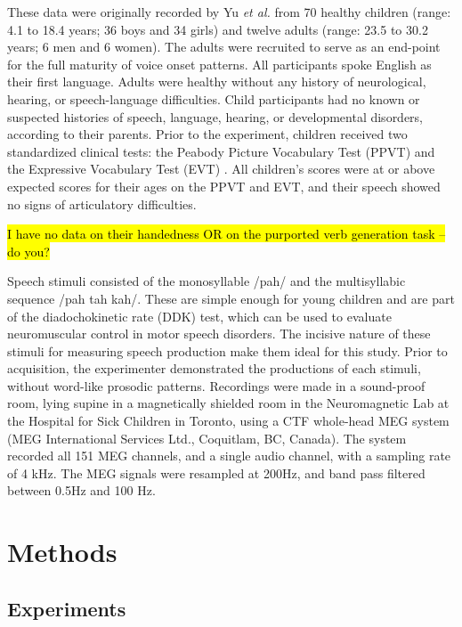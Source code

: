 \documentclass[a4paper]{article}
\newcommand{\FR}[1]{{\small \textcolor{red}{\hl{#1}}}}
\begin{document}
These data were originally recorded by Yu {\em et al.} \cite{Yu2015} from 70 healthy children (range: 4.1 to 18.4 years; 36 boys and 34 girls) and twelve adults (range: 23.5 to 30.2 years; 6 men and 6 women). The adults were recruited to serve as an end-point for the full maturity of voice onset patterns. All participants spoke English as their first language. Adults were healthy without any history of neurological, hearing, or speech-language difficulties. Child participants had no known or suspected histories of speech, language, hearing, or developmental disorders, according to their parents. Prior to the experiment, children received two standardized clinical tests: the Peabody Picture Vocabulary Test (PPVT) \cite{Dunn97} and the Expressive Vocabulary Test (EVT) \cite{EVT}. All children's scores were at or above expected scores for their ages on the PPVT and EVT, and their speech showed no signs of articulatory difficulties.

\FR{I have no data on their handedness OR on the purported verb generation task -- do you?}

Speech stimuli consisted of the monosyllable /pah/ and the multisyllabic sequence /pah tah kah/. These are simple enough for young children and are part of the diadochokinetic rate (DDK) test, which can be used to evaluate neuromuscular control in motor speech disorders. The incisive nature of these stimuli for measuring speech production make them ideal for this study. Prior to acquisition, the experimenter demonstrated the productions of each stimuli, without word-like prosodic patterns. Recordings were made in a sound-proof room, lying supine in a magnetically shielded room in the Neuromagnetic Lab at the Hospital for Sick Children in Toronto, using a CTF whole-head MEG system (MEG International Services Ltd., Coquitlam, BC, Canada). The system recorded all 151 MEG channels, and a single audio channel, with a sampling rate of 4 kHz. The MEG signals were resampled at 200Hz, and band pass filtered between 0.5Hz and 100 Hz.

\section{Methods}


\subsection{Experiments}
\end{document}
